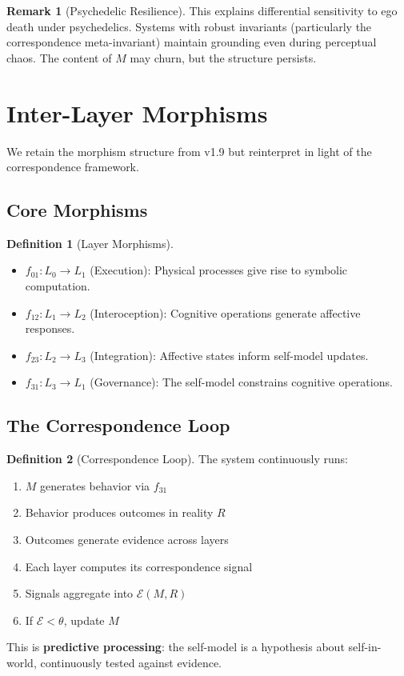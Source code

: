 \documentclass[12pt,a4paper]{article}
\theoremstyle{definition}
\newtheorem{definition}{Definition}[section]
\newtheorem{remark}{Remark}[section]
\begin{document}
\begin{remark}[Psychedelic Resilience]
This explains differential sensitivity to ego death under psychedelics. Systems with robust invariants (particularly the correspondence meta-invariant) maintain grounding even during perceptual chaos. The content of $M$ may churn, but the structure persists.
\end{remark}

\section{Inter-Layer Morphisms}

We retain the morphism structure from v1.9 but reinterpret in light of the correspondence framework.

\subsection{Core Morphisms}

\begin{definition}[Layer Morphisms]
\begin{itemize}
    \item $f_{01}: L_0 \to L_1$ (Execution): Physical processes give rise to symbolic computation.
    \item $f_{12}: L_1 \to L_2$ (Interoception): Cognitive operations generate affective responses.
    \item $f_{23}: L_2 \to L_3$ (Integration): Affective states inform self-model updates.
    \item $f_{31}: L_3 \to L_1$ (Governance): The self-model constrains cognitive operations.
\end{itemize}
\end{definition}

\subsection{The Correspondence Loop}

\begin{definition}[Correspondence Loop]
The system continuously runs:
\begin{enumerate}
    \item $M$ generates behavior via $f_{31}$
    \item Behavior produces outcomes in reality $R$
    \item Outcomes generate evidence across layers
    \item Each layer computes its correspondence signal
    \item Signals aggregate into $\mathcal{E}(M, R)$
    \item If $\mathcal{E} < \theta$, update $M$
\end{enumerate}
This is \textbf{predictive processing}: the self-model is a hypothesis about self-in-world, continuously tested against evidence.
\end{definition}
\end{document}
